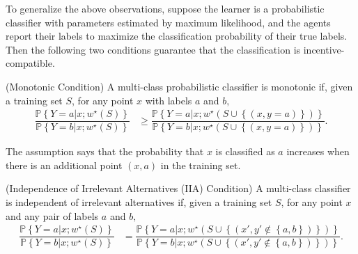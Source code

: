 \documentclass{article}
\begin{document}
\begin{figure}[H] \centering {} \label{fig:2dam}
\end{figure}
To generalize the above observations, suppose the learner is a probabilistic classifier with parameters estimated by maximum likelihood, and the agents report their labels to maximize the classification probability of their true labels. Then the following two conditions guarantee that the classification is incentive-compatible.
\newline \newline
\begin{df} \label{df:mono} 
(Monotonic Condition) A multi-class probabilistic classifier is monotonic if, given a training set $S $, for any point $x $ with labels $a $ and $b, $
\begin{align*}
\dfrac{\mathbb{P}\left\{Y = a | x ; w^\star \left(S\right)\right\}}{\mathbb{P}\left\{Y = b | x ; w^\star \left(S\right)\right\}} &\geq  \dfrac{\mathbb{P}\left\{Y = a | x ; w^\star \left(S \cup \left\{\left(x, y = a\right)\right\}\right)\right\}}{\mathbb{P}\left\{Y = b | x ; w^\star \left(S \cup \left\{\left(x, y = a\right)\right\}\right)\right\}}.
\end{align*}\end{df}
The assumption says that the probability that $x $ is classified as $a $ increases when there is an additional point $\left(x , a \right)$ in the training set.
\newline \newline
\begin{df} \label{df:iia} 
(Independence of Irrelevant Alternatives (IIA) Condition) A multi-class classifier is independent of irrelevant alternatives if, given a training set $S $, for any point $x $ and any pair of labels $a $ and $b, $
\begin{align*}
\dfrac{\mathbb{P}\left\{Y = a | x ; w^\star \left(S\right)\right\}}{\mathbb{P}\left\{Y = b | x ; w^\star \left(S\right)\right\}} &= \dfrac{\mathbb{P}\left\{Y = a | x ; w^\star \left(S \cup \left\{\left(x', y' \notin \left\{a, b\right\}\right)\right\}\right)\right\}}{\mathbb{P}\left\{Y = b | x ; w^\star \left(S \cup \left\{\left(x', y' \notin \left\{a, b\right\}\right)\right\}\right)\right\}}.
\end{align*}\end{df}
\end{document}
